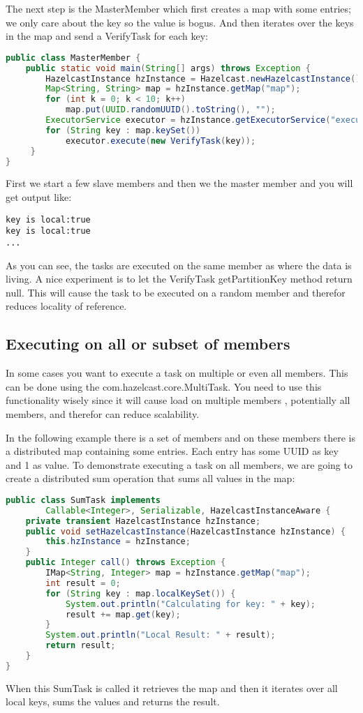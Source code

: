 The next step is the MasterMember which first creates a map with some entries; we only care about the key so the value is bogus. And then iterates over the keys in the map and send a VerifyTask for each key:
\begin{lstlisting}[language=java]
public class MasterMember {
    public static void main(String[] args) throws Exception {
        HazelcastInstance hzInstance = Hazelcast.newHazelcastInstance();
        Map<String, String> map = hzInstance.getMap("map");
        for (int k = 0; k < 10; k++) 
            map.put(UUID.randomUUID().toString(), "");
        ExecutorService executor = hzInstance.getExecutorService("executor");
        for (String key : map.keySet()) 
            executor.execute(new VerifyTask(key));
     }
}
\end{lstlisting}
First we start a few slave members and then we the master member and you will get output like:
\begin{lstlisting}
key is local:true
key is local:true
...
\end{lstlisting}
As you can see, the tasks are executed on the same member as where the data is living. A nice experiment is to let the VerifyTask getPartitionKey method return null. This will cause the task to be executed on a random member and therefor reduces locality of reference.

\subsection{Executing on all or subset of members}
In some cases you want to execute a task on multiple or even all members. This can be done using the com.hazelcast.core.MultiTask. You need to use this functionality wisely since it will cause load on multiple members , potentially all members, and therefor can reduce scalability.

In the following example there is a set of members and on these members there is a distributed map containing some entries. Each entry has some UUID as key and 1 as value. To demonstrate executing a task on all members, we are going to create a distributed sum operation that sums all values in the map:
\begin{lstlisting}[language=java]
public class SumTask implements
        Callable<Integer>, Serializable, HazelcastInstanceAware {
    private transient HazelcastInstance hzInstance;
    public void setHazelcastInstance(HazelcastInstance hzInstance) {
        this.hzInstance = hzInstance;
    }
    public Integer call() throws Exception {
        IMap<String, Integer> map = hzInstance.getMap("map");
        int result = 0;
        for (String key : map.localKeySet()) {
            System.out.println("Calculating for key: " + key);
            result += map.get(key);
        }
        System.out.println("Local Result: " + result);
        return result;
    }
}
\end{lstlisting}
When this SumTask is called it retrieves the map and then it iterates over all local keys, sums the values and returns the result.

